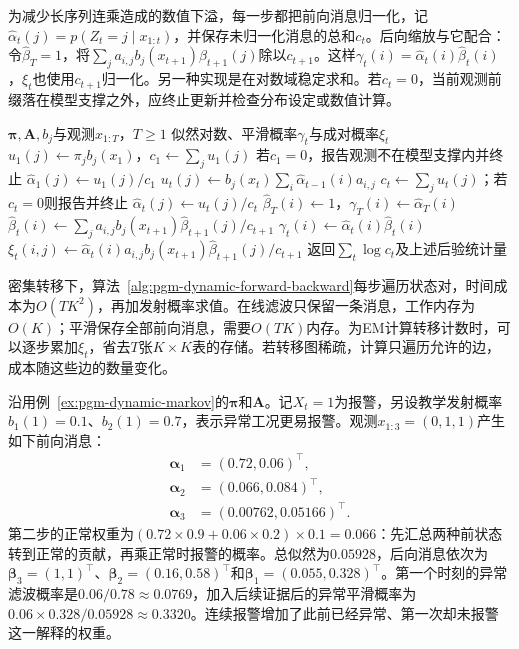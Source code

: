 为减少长序列连乘造成的数值下溢，每一步都把前向消息归一化，记$\widehat\alpha_t(j)=p(Z_t=j\mid x_{1:t})$，并保存未归一化消息的总和$c_t$。后向缩放与它配合：令$\widehat\beta_T=1$，将$\sum_j a_{i,j}b_j(x_{t+1})\widehat\beta_{t+1}(j)$除以$c_{t+1}$。这样$\gamma_t(i)=\widehat\alpha_t(i)\widehat\beta_t(i)$，$\xi_t$也使用$c_{t+1}$归一化。另一种实现是在对数域稳定求和。若$c_t=0$，当前观测前缀落在模型支撑之外，应终止更新并检查分布设定或数值计算。

\begin{algorithm}
  \label{alg:pgm-dynamic-forward-backward}
  \begin{algorithmic}[1]
    \Require $\bm{\pi},\bm{A},b_j$与观测$x_{1:T}$，$T\geq1$
    \Ensure 似然对数、平滑概率$\gamma_t$与成对概率$\xi_t$
    \State $u_1(j)\gets\pi_jb_j(x_1)$，$c_1\gets\sum_j u_1(j)$
    \State 若$c_1=0$，报告观测不在模型支撑内并终止
    \State $\widehat\alpha_1(j)\gets u_1(j)/c_1$
      \State $u_t(j)\gets b_j(x_t)\sum_i\widehat\alpha_{t-1}(i)a_{i,j}$
      \State $c_t\gets\sum_j u_t(j)$；若$c_t=0$则报告并终止
      \State $\widehat\alpha_t(j)\gets u_t(j)/c_t$
    \EndFor
    \State $\widehat\beta_T(i)\gets1$，$\gamma_T(i)\gets\widehat\alpha_T(i)$
      \State $\widehat\beta_t(i)\gets
        \sum_j a_{i,j}b_j(x_{t+1})\widehat\beta_{t+1}(j)/c_{t+1}$
      \State $\gamma_t(i)\gets\widehat\alpha_t(i)\widehat\beta_t(i)$
      \State $\xi_t(i,j)\gets
        \widehat\alpha_t(i)a_{i,j}b_j(x_{t+1})
        \widehat\beta_{t+1}(j)/c_{t+1}$
    \EndFor
    \State 返回$\sum_t\log c_t$及上述后验统计量
  \end{algorithmic}
\end{algorithm}

密集转移下，算法~\ref{alg:pgm-dynamic-forward-backward}每步遍历状态对，时间成本为$O(TK^2)$，再加发射概率求值。在线滤波只保留一条消息，工作内存为$O(K)$；平滑保存全部前向消息，需要$O(TK)$内存。为EM计算转移计数时，可以逐步累加$\xi_t$，省去$T$张$K\times K$表的存储。若转移图稀疏，计算只遍历允许的边，成本随这些边的数量变化。

\begin{example}[报警证据怎样改变过去的判断]
  \label{ex:pgm-dynamic-hmm}
  沿用例~\ref{ex:pgm-dynamic-markov}的$\bm{\pi}$和$\bm{A}$。记$X_t=1$为报警，另设教学发射概率$b_1(1)=0.1$、$b_2(1)=0.7$，表示异常工况更易报警。观测$x_{1:3}=(0,1,1)$产生如下前向消息：
  \[
    \begin{aligned}
      \bm{\alpha}_1&=(0.72,0.06)^\top,\\
      \bm{\alpha}_2&=(0.066,0.084)^\top,\\
      \bm{\alpha}_3&=(0.00762,0.05166)^\top.
    \end{aligned}
  \]
  第二步的正常权重为$(0.72\times0.9+0.06\times0.2)\times0.1=0.066$：先汇总两种前状态转到正常的贡献，再乘正常时报警的概率。总似然为$0.05928$，后向消息依次为$\bm{\beta}_3=(1,1)^\top$、$\bm{\beta}_2=(0.16,0.58)^\top$和$\bm{\beta}_1=(0.055,0.328)^\top$。第一个时刻的异常滤波概率是$0.06/0.78\approx0.0769$，加入后续证据后的异常平滑概率为$0.06\times0.328/0.05928\approx0.3320$。连续报警增加了此前已经异常、第一次却未报警这一解释的权重。
\end{example}

